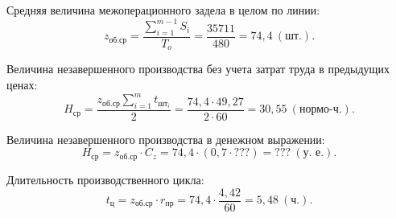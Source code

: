 Средняя величина межоперационного задела в целом по линии:
\begin{equation*}
  z_{\text{об.ср}} = \dfrac{\sum^{m-1}_{i=1} S_i}{T_o} =
  \dfrac{35711}{480} = 74{,}4 \: (\text{шт.}).
\end{equation*}

Величина незавершенного производства без учета затрат труда в предыдущих ценах:
\begin{equation*}
  H_{\text{ср}} = \dfrac{z_{\text{об.ср}} \sum^m_{i=1} t_{\text{шт}_i}}{2} =
  \dfrac{74{,}4 \cdot 49{,}27}{2 \cdot 60} = 30{,}55 \: (\text{нормо-ч.}).
\end{equation*}

Величина незавершенного производства в денежном выражении:
\begin{equation*}
  H_{\text{ср}} = z_{\text{об.ср}} \cdot C_z = 
  74{,}4 \cdot (0{,}7 \cdot ???) = ??? \: (\text{у.~е.}).
\end{equation*}

Длительность производственного цикла:
\begin{equation*}
  t_{\text{ц}} = z_{\text{об.ср}} \cdot r_{\text{пр}} = 
  74{,}4 \cdot \dfrac{4{,}42}{60} = 5{,}48 \: (\text{ч.}).
\end{equation*}
